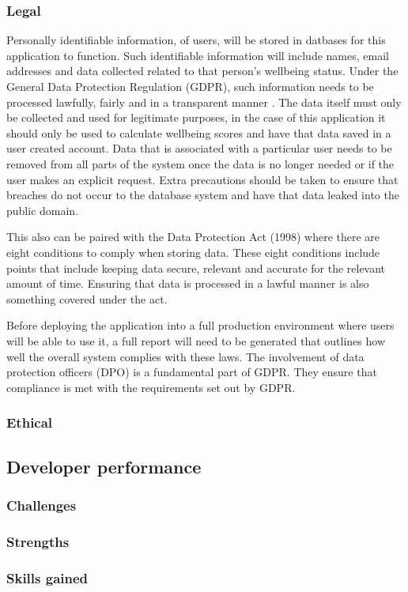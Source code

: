 \subsubsection{Legal}
Personally identifiable information, of users, will be stored in datbases for this application to function.
Such identifiable information will include names, email addresses and data collected related to that person's wellbeing status.
Under the General Data Protection Regulation (GDPR), such information needs to be processed lawfully, fairly and in a transparent manner \cite{unihighlands2018sevenprinciples}.
The data itself must only be collected and used for legitimate purposes, in the case of this application it should only be used to calculate wellbeing 
scores and have that data saved in a user created account.
Data that is associated with a particular user needs to be removed from all parts of the system once the data is no longer needed or if the user makes
an explicit request.
Extra precautions should be taken to ensure that breaches do not occur to the database system and have that data leaked into the public domain.

This also can be paired with the Data Protection Act (1998) where there are eight conditions to comply when storing data.
These eight conditions include points that include keeping data secure, relevant and accurate for the relevant amount of time. 
Ensuring that data is processed in a lawful manner is also something covered under the act.

Before deploying the application into a full production environment where users will be able to use it, a full report will need to be generated that
outlines how well the overall system complies with these laws.
The involvement of data protection officers (DPO) is a fundamental part of GDPR. 
They ensure that compliance is met with the requirements set out by GDPR.
\subsubsection{Ethical}

\subsection{Developer performance}

\subsubsection{Challenges}

\subsubsection{Strengths}

\subsubsection{Skills gained}